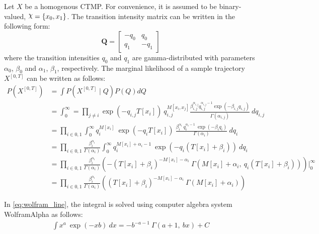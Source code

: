 Let $ X $ be a homogenous CTMP. For convenience, it is assumed to be binary-valued, $ \rchi = \left\lbrace x_{0}, x_{1} \right\rbrace $. The transition intensity matrix can be written in the following form:
\begin{equation}
\textbf{Q} = 
\begin{bmatrix}
-q_{0} & q_{0} \\
q_{1} & -q_{1}
\end{bmatrix}
\end{equation}
where the transition intensities $ q_{0} $ and $ q_{1} $ are gamma-distributed with parameters $ \alpha_{0}$, $ \beta_{0} $ and $ \alpha_{1} $, $ \beta_{1} $, respectively. The marginal likelihood of a sample trajectory $ X^{[0,T]} $ can be written as follows:
\begin{align}
P(X^{[0, T]}) & = \int  P(X^{[0, T]}\mid Q)P(Q) dQ \nonumber\\ 
& = \int_{0}^{\infty} = \prod_{j \neq i}  \exp(-q_{i,j}T[x_{i}])\ q_{i,j}^{M[x_{i},x_{j}]} \frac{\beta_{i,j}^{\alpha_{i,j}}{q_{i,j}^{\alpha_{i,j}-1}}\exp(-\beta_{i,j}q_{i,j})}{\Gamma(\alpha_{i,j})} \ dq_{i,j} \nonumber\\ 
& = \prod_{i\in{0,1}}\int_{0}^{\infty} q_{i}^{M[x_{i}]} \ \exp(-q_{i}T[x_{i}]) \  \frac{\beta_{i}^{\alpha_{i}} \ q_{i}^{\alpha_{i}-1}\ \exp(-\beta_{i}q_{i})}{\Gamma(\alpha_{i})} \ dq_{i} \nonumber\\ 
& = \prod_{i\in{0,1}} \frac{\beta_{i}^{\alpha_{i}}}{\Gamma(\alpha_{i})} \int_{0}^{\infty} q_{i}^{M[x_{i}] + \alpha_{i} -1} \ \exp(-q_{i}(T[x_{i}]+\beta_{i})) \ dq_{i} \label{eq:wolfram_line}\\ 
& = \prod_{i\in{0,1}} \frac{\beta_{i}^{\alpha_{i}}}{\Gamma(\alpha_{i})} \left( -(T[x_{i}]+\beta_{i})^{-M[x_{i}] - \alpha_{i}}\ \Gamma(M[x_{i}] + \alpha_{i}, \ q_{i}(T[x_{i}]+\beta_{i})) \right) \Big|_0^\infty  \nonumber\\ 
& = \prod_{i\in{0,1}} \frac{\beta_{i}^{\alpha_{i}}}{\Gamma(\alpha_{i})} \left( (T[x_{i}]+\beta_{i})^{-M[x_{i}] - \alpha_{i}}\ \Gamma(M[x_{i}] + \alpha_{i}) \right)
\label{eq:Marg_traj}
\end{align}

In \autoref{eq:wolfram_line}, the integral is solved using computer algebra system WolframAlpha as follows:
\begin{align}
\int x^{a} \ \exp(-xb) \ dx = -b^{-a-1} \ \Gamma(a+1, \ bx) + C
\label{eq:integral}
\end{align}

